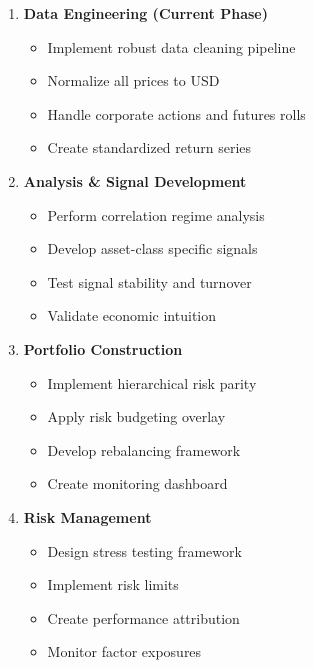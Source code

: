 \documentclass{article}
\begin{document}
\begin{enumerate}
    \item \textbf{Data Engineering (Current Phase)}
    \begin{itemize}
        \item Implement robust data cleaning pipeline
        \item Normalize all prices to USD
        \item Handle corporate actions and futures rolls
        \item Create standardized return series
    \end{itemize}
    
    \item \textbf{Analysis \& Signal Development}
    \begin{itemize}
        \item Perform correlation regime analysis
        \item Develop asset-class specific signals
        \item Test signal stability and turnover
        \item Validate economic intuition
    \end{itemize}
    
    \item \textbf{Portfolio Construction}
    \begin{itemize}
        \item Implement hierarchical risk parity
        \item Apply risk budgeting overlay
        \item Develop rebalancing framework
        \item Create monitoring dashboard
    \end{itemize}
    
    \item \textbf{Risk Management}
    \begin{itemize}
        \item Design stress testing framework
        \item Implement risk limits
        \item Create performance attribution
        \item Monitor factor exposures
    \end{itemize}
\end{enumerate}
\end{document}
